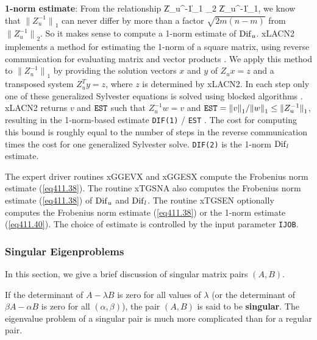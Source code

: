 {\bf 1-norm estimate}: From the relationship
\bq\label{eq411.39}
 {\|Z_u^{-1}\|}_{1} _2 \leq {}
{\|Z_u^{-1}\|}_{1},
\eq
we know that ${\|Z_u^{-1}\|}_{1}$ can never differ by more than a factor $\sqrt{2m(n -m)}$
from ${\|Z_u^{-1}\|}_2$. So it makes sense to compute a
1-norm estimate of ${\rm Dif}_u$.
xLACN2 implements a method for estimating the 1-norm of a square matrix,
using reverse communication for evaluating matrix and vector products
\cite{hager84,higham89}. We apply this method to ${\|Z_u^{-1}\|}_1$
by providing the solution vectors $x$ and $y$ of $Z_ux = z$  and
a transposed system $Z_u^Ty = z$, where $z$ is determined by xLACN2.
In each step only one of these generalized Sylvester equations is solved
using blocked algorithms \cite{kagstromporomaa93a}.
xLACN2 returns $v$ and ${\tt EST}$ such that $Z_u^{-1}w = v$ and ${\tt EST}
= {\|v\|}_{1}/ {\|w\|}_{1} \leq {\|Z_u^{-1}\|}_{1}$,
resulting in the 1-norm-based estimate
\bq\label{eq411.40}
{\tt DIF(1)}  / {\tt EST} .
\eq
The cost for computing this bound is roughly equal to the number of steps
in the reverse communication times the cost for one generalized
Sylvester solve. {\tt DIF(2)} is the 1-norm ${\rm Dif}_l$ estimate.

The expert driver routines xGGEVX and xGGESX compute the Frobenius
norm estimate (\ref{eq411.38}).
The routine xTGSNA also computes the Frobenius
norm estimate (\ref{eq411.38}) of ${\rm Dif}_u$ and ${\rm Dif}_l$.
The routine xTGSEN optionally computes the Frobenius norm estimate
(\ref{eq411.38}) or the 1-norm estimate (\ref{eq411.40}).
The choice of estimate is controlled by the input parameter {\tt IJOB}.

\subsubsection{Singular Eigenproblems}\label{sec_singular}

In this section, we give a brief discussion of singular
matrix pairs $(A,B)$.

If the determinant of $A - \lambda B$ is zero for all values of $\lambda$
(or the determinant of $\beta A  - \alpha B$ is zero for all $(\alpha,\beta)$),
the pair $(A,B)$ is said to be {\bf singular}.
The eigenvalue problem of a singular pair is much more complicated
than for a regular pair.

